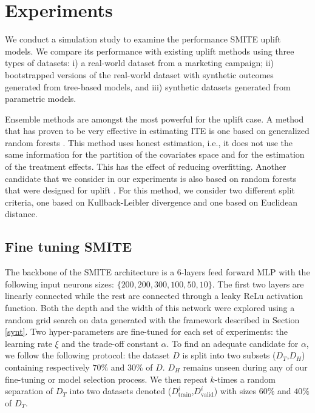 \documentclass{article}
\begin{document}
\section{Experiments}
\label{sec:experiments}

We conduct a simulation study to examine the performance SMITE uplift models. We compare its performance with existing uplift methods using three types of datasets: i) a real-world dataset from a marketing campaign; ii)  bootstrapped versions of the real-world dataset with synthetic outcomes generated from tree-based models, and iii) synthetic datasets generated from parametric models.

Ensemble methods are amongst the most powerful for the uplift case. A method that has proven to be very effective in estimating ITE is one based on generalized random forests \citep{athey2019generalized}. This method uses honest estimation, i.e., it does not use the same information for the partition of the covariates space and for the estimation of the treatment effects. This has the effect of reducing overfitting. Another candidate that we consider in our experiments is also based on random forests that were designed for uplift \citep{guelman2012random, jaskowski2012uplift, soltys2015ensemble}. For this method, we consider two different split criteria, one based on Kullback-Leibler divergence and one based on Euclidean distance.

\subsection{Fine tuning SMITE}
The backbone of the SMITE architecture is a $6$-layers feed forward MLP with the following input neurons sizes: $\{200,200,300,100,50,10\}$. The first two layers are linearly connected while the rest are connected through a leaky ReLu activation function. Both the depth and the width of this network were explored using a random grid search on data generated with the framework described in Section \ref{synt}. Two hyper-parameters are fine-tuned for each set of experiments: the learning rate $\xi$ and the trade-off constant $\alpha$. To find an adequate candidate for $\alpha$, we follow the following protocol: the dataset $D$ is split into two subsets ($D_T$,$D_H$) containing respectively $70\%$ and $30\%$ of $D$. $D_H$ remains unseen during any of our fine-tuning or model selection process. We then repeat $k$-times a random separation of $D_T$ into two datasets denoted ($D^{i}_{\mathrm{train}}$,$D^{i}_{\mathrm{valid}}$) with sizes $60\%$ and $40\%$ of $D_T$. 
\end{document}
